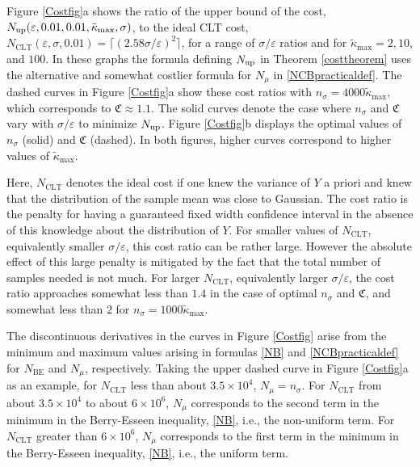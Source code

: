\documentclass[graybox]{svmult}
\newcommand{\fudge}{\mathfrak{C}}
\newcommand{\tkappa}{\tilde{\kappa}}
\begin{document}
Figure \ref{Costfig}a shows the ratio of the upper bound of the cost, $N_{\rm{up}}(\varepsilon,0.01,0.01, \tkappa_{\max}, \sigma)$, to the ideal CLT cost, $N_{\mathrm{CLT}}(\varepsilon,\sigma,0.01)=\lceil (2.58\sigma/\varepsilon)^2\rceil$, for a range of $\sigma/\varepsilon$ ratios and for $\tkappa_{\max}=2, 10$, and $100$. In these graphs the formula defining $N_{\rm{up}}$ in Theorem \ref{costtheorem} uses the alternative and somewhat costlier formula for $N_{\mu}$ in \eqref{NCBpracticaldef}. The dashed curves in Figure \ref{Costfig}a show these cost ratios with $n_\sigma=4000\tkappa_{\max}$, which corresponds to $\fudge \approx 1.1$.  The solid curves denote the case where $n_\sigma$ and $\fudge$ vary with $\sigma/\varepsilon$ to minimize $N_{\rm{up}}$.  Figure \ref{Costfig}b displays the optimal values of $n_\sigma$ (solid) and $\fudge$ (dashed).  In both figures, higher curves correspond to higher values of $\tkappa_{\max}$. 

Here, $N_{\mathrm{CLT}}$ denotes the ideal cost if one knew the variance of $Y$ a priori and knew that the distribution of the sample mean was close to Gaussian. The cost ratio is the penalty for having a guaranteed fixed width confidence interval in the absence of this knowledge about the distribution of $Y$.  For smaller values of $N_{\mathrm{CLT}}$, equivalently smaller  $\sigma/\varepsilon$, this cost ratio can be rather large.  However the absolute effect of this large penalty is mitigated by the fact that the total number of samples needed is not much.  For larger $N_{\mathrm{CLT}}$, equivalently larger  $\sigma/\varepsilon$, the cost ratio approaches somewhat less than $1.4$ in the case of optimal $n_\sigma$ and $\fudge$, and somewhat less than $2$ for $n_\sigma=1000\tkappa_{\max}$.

The discontinuous derivatives in the curves in Figure \ref{Costfig} arise from the minimum and maximum values arising in formulas \eqref{NB} and \eqref{NCBpracticaldef} for $N_{\text{BE}}$ and $N_\mu$, respectively. Taking the upper dashed curve in Figure \ref{Costfig}a as an example, for $N_{\text{CLT}}$ less than about $3.5\times 10^4$, $N_\mu=n_\sigma$.  For $N_{\text{CLT}}$ from about $3.5\times 10^4$ to about $6\times 10^6$, $N_\mu$ corresponds to the second term in the minimum in the Berry-Esseen inequality, \eqref{NB}, i.e., the non-uniform term.  For $N_{\text{CLT}}$ greater than $6\times 10^6$, $N_\mu$ corresponds to the first term in the minimum in the Berry-Esseen inequality, \eqref{NB}, i.e., the uniform term.
\end{document}
